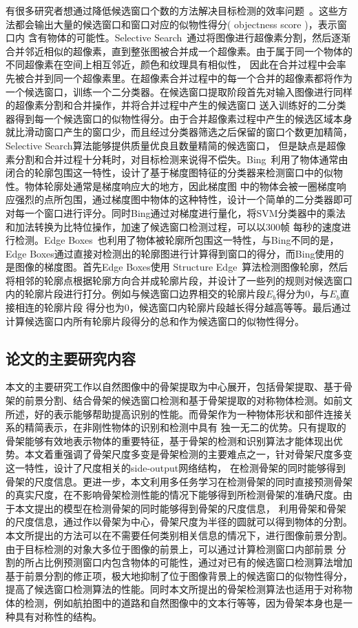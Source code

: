 \documentclass[UTF8]{ctexart}
\numberwithin{equation}{section} %
\numberwithin{table}{section} %
\begin{document}
有很多研究者想通过降低候选窗口个数的方法解决目标检测的效率问题~\cite{uijlings2013selective, cheng2014bing,zitnick2014edge}。这些方法都会输出大量的候选窗口和窗口对应的似物性得分( objectness score )，表示窗口内
含有物体的可能性。Selective Search~\cite{uijlings2013selective}通过将图像进行超像素分割，然后逐渐合并邻近相似的超像素，直到整张图被合并成一个超像素。由于属于同一个物体的不同超像素在空间上相互邻近，颜色和纹理具有相似性，
因此在合并过程中会率先被合并到同一个超像素里。在超像素合并过程中的每一个合并的超像素都将作为一个候选窗口，训练一个二分类器。在候选窗口提取阶段首先对输入图像进行同样的超像素分割和合并操作，并将合并过程中产生的候选窗口
送入训练好的二分类器得到每一个候选窗口的似物性得分。由于合并超像素过程中产生的候选区域本身就比滑动窗口产生的窗口少，而且经过分类器筛选之后保留的窗口个数更加精简，Selective Search算法能够提供质量优良且数量精简的候选窗口，
但是缺点是超像素分割和合并过程十分耗时，对目标检测来说得不偿失。Bing~\cite{cheng2014bing}利用了物体通常由闭合的轮廓包围这一特性，设计了基于梯度图特征的分类器来检测窗口中的似物性。物体轮廓处通常是梯度响应大的地方，因此梯度图
中的物体会被一圈梯度响应强烈的点所包围，通过梯度图中物体的这种特性，设计一个简单的二分类器即可对每一个窗口进行评分。同时Bing通过对梯度进行量化，将SVM分类器中的乘法和加法转换为比特位操作，加速了候选窗口检测过程，可以以300帧
每秒的速度进行检测。Edge Boxes~\cite{zitnick2014edge}也利用了物体被轮廓所包围这一特性，与Bing不同的是，Edge Boxes通过直接对检测出的轮廓图进行计算得到窗口的得分，而Bing使用的是图像的梯度图。首先Edge Boxes使用
Structure Edge~\cite{dollar2015fast}算法检测图像轮廓，然后将相邻的轮廓点根据轮廓方向合并成轮廓片段，并设计了一些列的规则对候选窗口内的轮廓片段进行打分。例如与候选窗口边界相交的轮廓片段$E_b$得分为0，与$E_b$直接相连的轮廓片段
得分也为0，候选窗口内轮廓片段越长得分越高等等。最后通过计算候选窗口内所有轮廓片段得分的总和作为候选窗口的似物性得分。

\subsection{论文的主要研究内容}
本文的主要研究工作以自然图像中的骨架提取为中心展开，包括骨架提取、基于骨架的前景分割、结合骨架的候选窗口检测和基于骨架提取的对称物体检测。如前文所述，好的表示能够帮助提高识别的性能。而骨架作为一种物体形状和部件连接关系的精简表示，在非刚性物体的识别和检测中具有
独一无二的优势。只有提取的骨架能够有效地表示物体的重要特征，基于骨架的检测和识别算法才能体现出优势。本文着重强调了骨架尺度多变是骨架检测的主要难点之一，针对骨架尺度多变这一特性，设计了尺度相关的side-output网络结构，
在检测骨架的同时能够得到骨架的尺度信息。更进一步，本文利用多任务学习在检测骨架的同时直接预测骨架的真实尺度，在不影响骨架检测性能的情况下能够得到所检测骨架的准确尺度。由于本文提出的模型在检测骨架的同时能够得到骨架的尺度信息，
利用骨架和骨架的尺度信息，通过作以骨架为中心，骨架尺度为半径的圆就可以得到物体的分割。本文所提出的方法可以在不需要任何类别相关信息的情况下，进行图像前景分割。由于目标检测的对象大多位于图像的前景上，可以通过计算检测窗口内部前景
分割的所占比例预测窗口内包含物体的可能性，通过对已有的候选窗口检测算法增加基于前景分割的修正项，极大地抑制了位于图像背景上的候选窗口的似物性得分，提高了候选窗口检测算法的性能。同时本文所提出的骨架检测算法也适用于对称物体的检测，例如航拍图中的道路和自然图像中的文本行等等，因为骨架本身也是一种具有对称性的结构。
\end{document}
